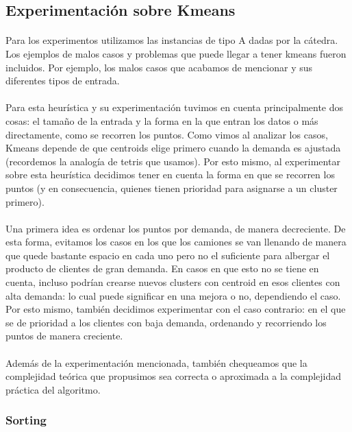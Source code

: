 \subsection{Experimentación sobre Kmeans}
\paragraph{}
Para los experimentos utilizamos las instancias de tipo A dadas por la cátedra. Los ejemplos de malos casos y problemas que puede llegar a tener kmeans fueron incluidos. Por ejemplo, los malos casos que acabamos de mencionar y sus diferentes tipos de entrada.
\paragraph{}
Para esta heurística y su experimentación tuvimos en cuenta principalmente dos cosas: el tamaño de la entrada y la forma en la que entran los datos o más directamente, como se recorren los puntos. Como vimos al analizar los casos, Kmeans depende de que centroids elige primero cuando la demanda es ajustada (recordemos la analogía de tetris que usamos). Por esto mismo, al experimentar sobre esta heurística decidimos tener en cuenta la forma en que se recorren los puntos (y en consecuencia, quienes tienen prioridad para asignarse a un cluster primero).
\paragraph{}
Una primera idea es ordenar los puntos por demanda, de manera decreciente. De esta forma, evitamos los casos en los que los camiones se van llenando de manera que quede bastante espacio en cada uno pero no el suficiente para albergar el producto de clientes de gran demanda. En casos en que esto no se tiene en cuenta, incluso podrían crearse nuevos clusters con centroid en esos clientes con alta demanda: lo cual puede significar en una mejora o no, dependiendo el caso. Por esto mismo, también decidimos experimentar con el caso contrario: en el que se de prioridad a los clientes con baja demanda, ordenando y recorriendo los puntos de manera creciente.
\paragraph{} 
Además de la experimentación mencionada, también chequeamos que la complejidad teórica que propusimos sea correcta o aproximada a la complejidad práctica del algoritmo.
\subsubsection{Sorting}

